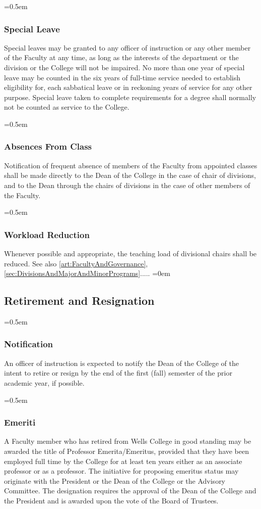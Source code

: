 \documentclass{manual}
\let\oldsubsection\subsection
\renewcommand\subsection{\leftskip=0em\oldsubsection}
\let\oldsubsubsection\subsubsection
\renewcommand\subsubsection{\leftskip=0.5em\oldsubsubsection}
\begin{document}
\subsubsection{Special Leave}\label{sec:FacultyCommittees.B}
Special leaves may be granted to any officer of instruction or any other member of the Faculty at any time, as long as the interests of the department or the division or the College will not be impaired. No more than one year of special leave may be counted in the six years of full-time service needed to establish eligibility for, each sabbatical leave or in reckoning years of service for any other purpose. Special leave taken to complete requirements for a degree shall normally not be counted as service to the College.

\subsubsection{Absences From Class}
Notification of frequent absence of members of the Faculty from appointed classes shall be made directly to the Dean of the College in the case of chair of divisions, and to the Dean through the chairs of divisions in the case of other members of the Faculty.

\subsubsection{Workload Reduction} \label{sub:WorkloadReduction}
Whenever possible and appropriate, the teaching load of divisional chairs shall be reduced. See also \cref{art:FacultyAndGovernance}, \cref{sec:DivisionsAndMajorAndMinorPrograms}.....
\subsection{Retirement and Resignation}

\subsubsection{Notification}
An officer of instruction is expected to notify the Dean of the College of the intent to retire or resign by the end of the first (fall) semester of the prior academic year, if possible.

\subsubsection{Emeriti}
A Faculty member who has retired from Wells College in good standing may be awarded the title of Professor Emerita/Emeritus, provided that they have been employed full time by the College for at least ten years either as an associate professor or as a professor. The initiative for proposing emeritus status may originate with the President or the Dean of the College or the Advisory Committee. The designation requires the approval of the Dean of the College and the President and is awarded upon the vote of the Board of Trustees.
\end{document}
